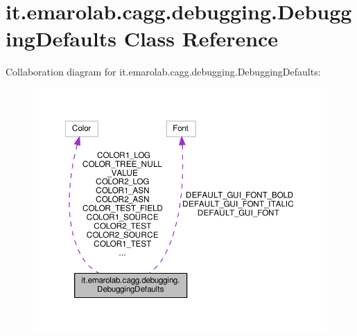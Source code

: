 \hypertarget{classit_1_1emarolab_1_1cagg_1_1debugging_1_1DebuggingDefaults}{\section{it.\-emarolab.\-cagg.\-debugging.\-Debugging\-Defaults Class Reference}
\label{classit_1_1emarolab_1_1cagg_1_1debugging_1_1DebuggingDefaults}
}


Collaboration diagram for it.\-emarolab.\-cagg.\-debugging.\-Debugging\-Defaults\-:\nopagebreak
\begin{figure}[H]
\begin{center}
\leavevmode
\includegraphics[width=350pt]{classit_1_1emarolab_1_1cagg_1_1debugging_1_1DebuggingDefaults__coll__graph}
\end{center}
\end{figure}
